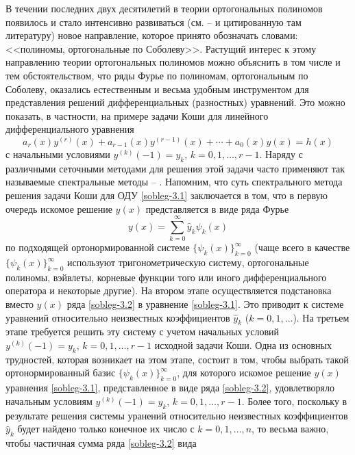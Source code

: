 В течении последних двух десятилетий в теории ортогональных полиномов появилось и стало
интенсивно развиваться (см. \cite{KwonLittl1} -- \cite{Shar2016} и цитированную там литературу) новое направление, которое принято обозначать словами: <<полиномы, ортогональные по Соболеву>>. Растущий интерес  к этому направлению теории ортогональных полиномов можно объяснить в том числе и тем обстоятельством, что ряды Фурье по полиномам, ортогональным по Соболеву, оказались естественным и весьма удобным инструментом для представления решений  дифференциальных (разностных) уравнений. Это можно показать, в частности, на примере  задачи Коши для линейного дифференциального уравнения
\begin{equation}\label{sobleg-3.1}
 a_r(x)y^{(r)}(x)+a_{r-1}(x)y^{(r-1)}(x)+\cdots+a_0(x)y(x)=h(x)
 \end{equation}
с начальными условиями $y^{(k)}(-1)=y_k$, $k=0,1,\ldots,r-1$.  Наряду с различными сеточными методами для решения этой задачи часто применяют так называемые спектральные методы \cite{Tref1} -- \cite{MMG2016}. Напомним, что суть спектрального метода решения задачи Коши  для ОДУ \eqref{sobleg-3.1} заключается в том, что в первую очередь искомое решение $y(x)$ представляется в виде ряда Фурье
\begin{equation}\label{sobleg-3.2}
 y(x)=\sum_{k=0}^\infty \hat y_k\psi_k(x)
 \end{equation}
по подходящей ортонормированной системе $\{\psi_k(x)\}_{k=0}^\infty$ (чаще всего в качестве $\{\psi_k(x)\}_{k=0}^\infty$ используют    тригонометрическую систему, ортогональные полиномы, вэйвлеты, корневые функции того или иного дифференциального оператора  и некоторые другие). На втором этапе осуществляется подстановка вместо $y(x)$ ряда \eqref{sobleg-3.2} в уравнение \eqref{sobleg-3.1}. Это приводит к системе уравнений относительно неизвестных коэффициентов $\hat y_k$ ($k=0,1,\ldots$). На третьем этапе требуется решить эту систему с учетом начальных условий  $y^{(
k)}(-1)=y_k$, $k=0,1,\ldots,r-1$ исходной задачи Коши.
Одна из основных трудностей, которая возникает на этом этапе, состоит в том, чтобы
выбрать такой ортонормированный базис $\{\psi_k(x)\}_{k=0}^\infty$, для которого искомое решение $y(x)$ уравнения \eqref{sobleg-3.1}, представленное в виде ряда  \eqref{sobleg-3.2}, удовлетворяло начальным условиям $y^{(k)}(-1)=y_k$, $k=0,1,\ldots,r-1$. Более того, поскольку в результате решения системы уранений относительно неизвестных коэффициентов $\hat y_k$  будет найдено только конечное их число с $k=0,1,\ldots, n$, то весьма важно, чтобы частичная сумма ряда \eqref{sobleg-3.2} вида
